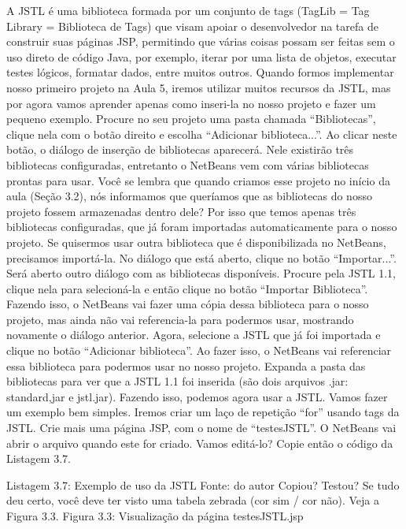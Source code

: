 A JSTL é uma biblioteca formada por um conjunto de tags (TagLib = Tag Library = Biblioteca de Tags) que visam apoiar o desenvolvedor na tarefa de construir suas páginas JSP, permitindo que várias coisas possam ser feitas sem o uso direto de código Java, por exemplo, iterar por uma lista de objetos, executar testes lógicos, formatar dados, entre muitos outros. Quando formos implementar nosso primeiro projeto na Aula 5, iremos utilizar muitos recursos da JSTL, mas por agora vamos aprender apenas como inseri-la no nosso projeto e fazer um pequeno exemplo.
Procure no seu projeto uma pasta chamada “Bibliotecas”, clique nela com o botão direito e escolha “Adicionar biblioteca...”. Ao clicar neste botão, o diálogo de inserção de bibliotecas aparecerá. Nele existirão três bibliotecas configuradas, entretanto o NetBeans vem com várias bibliotecas prontas para usar. Você se lembra que quando criamos esse projeto no início da aula (Seção 3.2), nós informamos que queríamos que as bibliotecas do nosso projeto fossem armazenadas dentro dele? Por isso que temos apenas três bibliotecas configuradas, que já foram importadas automaticamente para o nosso projeto. Se quisermos usar outra biblioteca que é disponibilizada no NetBeans, precisamos importá-la. No diálogo que está aberto, clique no botão “Importar...”. Será aberto outro diálogo com as bibliotecas disponíveis. Procure pela JSTL 1.1, clique nela para selecioná-la e então clique no botão “Importar Biblioteca”. Fazendo isso, o NetBeans vai fazer uma cópia dessa biblioteca para o nosso projeto, mas ainda não vai referencia-la para podermos usar, mostrando novamente o diálogo anterior. Agora, selecione a JSTL que já foi importada e clique no botão “Adicionar biblioteca”. Ao fazer isso, o NetBeans vai referenciar essa biblioteca para podermos usar no nosso projeto. Expanda a pasta das bibliotecas para ver que a JSTL 1.1 foi inserida (são dois arquivos .jar: standard,jar e jstl.jar).
Fazendo isso, podemos agora usar a JSTL. Vamos fazer um exemplo bem simples. Iremos criar um laço de repetição “for” usando tags da JSTL. Crie mais uma página JSP, com o nome de “testesJSTL”. O NetBeans vai abrir o arquivo quando este for criado. Vamos editá-lo? Copie então o código da Listagem 3.7.


Listagem 3.7: Exemplo de uso da JSTL
 Fonte: do autor
Copiou? Testou? Se tudo deu certo, você deve ter visto uma tabela zebrada (cor sim / cor não). Veja a Figura 3.3.
Figura 3.3: Visualização da página testesJSTL.jsp
 
